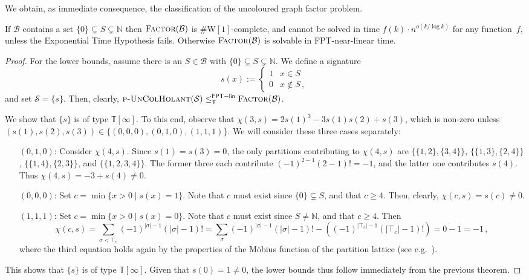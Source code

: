 \documentclass[authorcolumns,numberwithinsect]{no-lipics-v2022}
\newcommand{\W}{\mathrm{W}}
\newcommand{\fptlinred}{\leq^{\mathsf{FPT-lin}}_{\mathsf{T}}}
\begin{document}
We obtain, as immediate consequence, the classification of the uncoloured graph factor problem.
\begin{corollary}\label{cor:factor_classification_uncol}
    If $\mathcal{B}$ contains a set $\{0\} \subsetneq S \subsetneq \mathbb{N}$ then $\textsc{Factor}(\mathcal{B})$ is $\#\W[1]$-complete, and cannot be solved in time $f(k)\cdot n^{o(k/\log k)}$ for any function~$f$, unless the Exponential Time Hypothesis fails. Otherwise $\textsc{Factor}(\mathcal{B})$ is solvable in FPT-near-linear time.
\end{corollary}
\begin{proof}
    For the lower bounds, assume there is an $S\in \mathcal{B}$ with $\{0\} \subsetneq S \subsetneq \mathbb{N}$. We define a signature 
    \[s(x) := \begin{cases}
        1 & x \in S\\
        0 & x \notin S\,,
    \end{cases}\]
    and set $\mathcal{S}=\{s\}$. Then, clearly, $\textsc{p-UnColHolant}(\mathcal{S})\fptlinred \textsc{Factor}(\mathcal{B})$. 
    
    We show that $\{s\}$ is of type $\mathbb{T}[\infty]$. To this end, observe that $\chi(3,s)= 2s(1)^3 - 3s(1)s(2) + s(3)$, which is non-zero unless $(s(1),s(2),s(3))\in \{(0,0,0),(0,1,0),(1,1,1)\}$. We will consider these three cases separately:
\begin{itemize}[leftmargin=1.5cm]
    \item[$(0,1,0)$:] Consider $\chi(4,s)$. Since $s(1)=s(3)=0$, the only partitions contributing to $\chi(4,s)$ are $\{\{1,2\},\{3,4\}\}$, $\{\{1,3\},\{2,4\}\}$, $\{\{1,4\},\{2,3\}\}$, and $\{\{1,2,3,4\}\}$. The former three each contribute $(-1)^{2-1} (2-1)! = -1$, and the latter one contributes $s(4)$. Thus $\chi(4,s) = -3 +s(4)\neq 0$.
    \item[$(0,0,0)$:] Set $c=\min\{x>0 \mid s(x)= 1\}$. Note that $c$ must exist since $\{0\} \subsetneq S$, and that $c\geq 4$. Then, clearly, $\chi(c,s)= s(c)\neq 0$.
    \item[$(1,1,1)$:] Set $c=\min\{x>0 \mid s(x)= 0\}$. Note that $c$ must exist since $S\neq \mathbb{N}$, and that $c\geq 4$. Then
    \[\chi(c,s)= \sum_{\sigma < \top_c} (-1)^{|\sigma|-1} (|\sigma|-1)! = \sum_{\sigma} (-1)^{|\sigma|-1} (|\sigma|-1)! - \left((-1)^{|\top_c|-1} (|\top_c|-1)!\right) = 0 -1 = -1 \,,\]
    where the third equation holds again by the properties of the M\"obius function of the partition lattice (see e.g.\ \cite[Section 3.7]{Stanley11}).
\end{itemize}
This shows that $\{s\}$ is of type $\mathbb{T}[\infty]$. Given that $s(0)=1\neq 0$, the lower bounds thus follow immediately from the previous theorem.


\end{proof}
\end{document}
